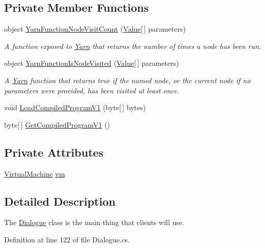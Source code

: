 \subsection*{Private Member Functions}
\begin{DoxyCompactItemize}
\item 
object \hyperlink{a00082_a10c9f22d3f55e74f091cd6069c431094}{Yarn\-Function\-Node\-Visit\-Count} (\hyperlink{a00177}{Value}\mbox{[}$\,$\mbox{]} parameters)
\begin{DoxyCompactList}\small\item\em A function exposed to \hyperlink{a00041}{Yarn} that returns the number of times a node has been run. \end{DoxyCompactList}\item 
object \hyperlink{a00082_a1ab129bd84381928531d503304ca08d6}{Yarn\-Function\-Is\-Node\-Visited} (\hyperlink{a00177}{Value}\mbox{[}$\,$\mbox{]} parameters)
\begin{DoxyCompactList}\small\item\em A \hyperlink{a00041}{Yarn} function that returns true if the named node, or the current node if no parameters were provided, has been visited at least once. \end{DoxyCompactList}\item 
void \hyperlink{a00082_a706df08e842c2419f7a66fd40c0a544f}{Load\-Compiled\-Program\-V1} (byte\mbox{[}$\,$\mbox{]} bytes)
\item 
byte\mbox{[}$\,$\mbox{]} \hyperlink{a00082_a070898dbc07fd7d0a74d7c3ac1848beb}{Get\-Compiled\-Program\-V1} ()
\end{DoxyCompactItemize}
\subsection*{Private Attributes}
\begin{DoxyCompactItemize}
\item 
\hyperlink{a00152}{Virtual\-Machine} \hyperlink{a00082_a8c1319357a9df6cff051328fb33224c7}{vm}
\end{DoxyCompactItemize}


\subsection{Detailed Description}
The \hyperlink{a00082}{Dialogue} class is the main thing that clients will use. 

Definition at line 122 of file Dialogue.\-cs.



